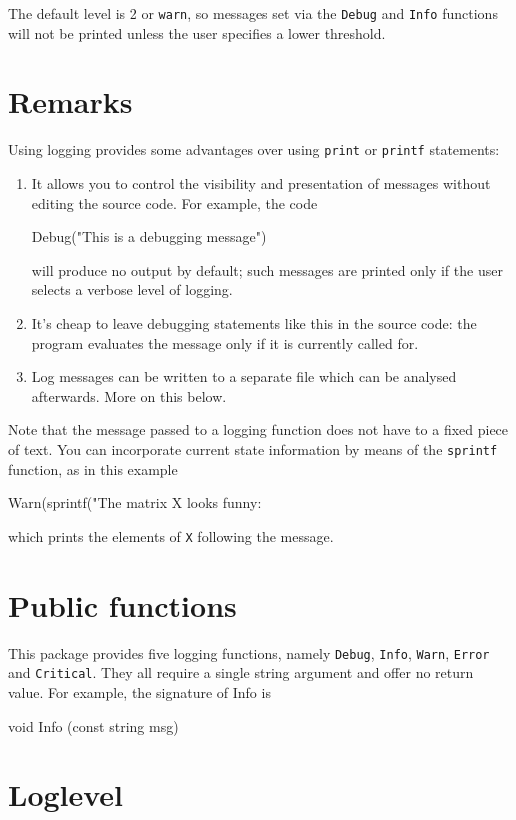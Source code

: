 \documentclass{article}
\begin{document}
The default level is 2 or \texttt{warn}, so messages set via
the \texttt{Debug} and \texttt{Info} functions will not be printed
unless the user specifies a lower threshold.

\section{Remarks}

Using logging provides some advantages over using \texttt{print} or
\texttt{printf} statements:
\begin{enumerate}
\item It allows you to control the visibility and presentation of
  messages without editing the source code. For example, the code
\begin{code}
  Debug("This is a debugging message")
\end{code}
  will produce no output by default; such messages are printed only
  if the user selects a verbose level of logging.
\item It's cheap to leave debugging statements like this in the source
  code: the program evaluates the message only if it is currently
  called for.
\item Log messages can be written to a separate file which can be
  analysed afterwards. More on this below.
\end{enumerate}

Note that the message passed to a logging function does not have to a
fixed piece of text. You can incorporate current state information by
means of the \texttt{sprintf} function, as in this example
\begin{code}
  Warn(sprintf("The matrix X looks funny:\n%
\end{code}
which prints the elements of \texttt{X} following the message.

\section{Public functions}

This package provides five logging functions, namely \texttt{Debug},
\texttt{Info}, \texttt{Warn}, \texttt{Error} and \texttt{Critical}.
They all require a single string argument and offer no return
value. For example, the signature of Info is
\begin{code}
void Info (const string msg)
\end{code}

\section{Loglevel}
\end{document}
